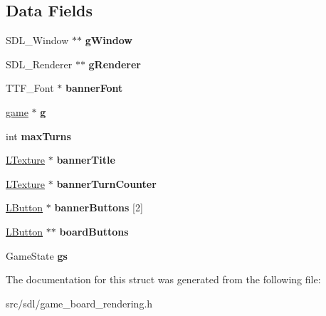 \subsection*{Data Fields}
\begin{DoxyCompactItemize}
\item 
\mbox{\label{structsdl_board_a04da60f12d502931bdcc034cad86347f}} 
S\+D\+L\+\_\+\+Window $\ast$$\ast$ {\bfseries g\+Window}
\item 
\mbox{\label{structsdl_board_ad916adf6a3c707eda83ceefbdee69a26}} 
S\+D\+L\+\_\+\+Renderer $\ast$$\ast$ {\bfseries g\+Renderer}
\item 
\mbox{\label{structsdl_board_a108a55905975a9bc5f2486e3284fc86e}} 
T\+T\+F\+\_\+\+Font $\ast$ {\bfseries banner\+Font}
\item 
\mbox{\label{structsdl_board_a3f3b791c64b074b7d315a41416fd452d}} 
\hyperlink{structt__game}{game} $\ast$ {\bfseries g}
\item 
\mbox{\label{structsdl_board_a69bf27f2296ddb5e24d78f17832a16ec}} 
int {\bfseries max\+Turns}
\item 
\mbox{\label{structsdl_board_a0e572169338230e30d01a3b1af9324a1}} 
\hyperlink{structtexture}{L\+Texture} $\ast$ {\bfseries banner\+Title}
\item 
\mbox{\label{structsdl_board_aa575bc57abd27271283775a414c5721b}} 
\hyperlink{structtexture}{L\+Texture} $\ast$ {\bfseries banner\+Turn\+Counter}
\item 
\mbox{\label{structsdl_board_a898a14b8dbc4ff8f956752cbd5df0aab}} 
\hyperlink{structbutton}{L\+Button} $\ast$ {\bfseries banner\+Buttons} \mbox{[}2\mbox{]}
\item 
\mbox{\label{structsdl_board_ace03d870a8c8c0b9a2219cfbd2d5ffbc}} 
\hyperlink{structbutton}{L\+Button} $\ast$$\ast$ {\bfseries board\+Buttons}
\item 
\mbox{\label{structsdl_board_a326ac0832310ae96cbae0f489eedac92}} 
Game\+State {\bfseries gs}
\end{DoxyCompactItemize}


The documentation for this struct was generated from the following file\+:\begin{DoxyCompactItemize}
\item 
src/sdl/game\+\_\+board\+\_\+rendering.\+h\end{DoxyCompactItemize}
